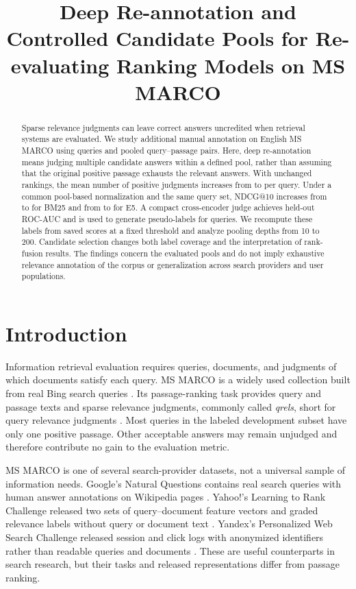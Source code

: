 \documentclass[runningheads,a4paper]{llncs}
\title{Deep Re-annotation and Controlled Candidate Pools for Re-evaluating Ranking Models on MS MARCO}
\author{}
\institute{}
\begin{document}
\maketitle
\begin{abstract}
Sparse relevance judgments can leave correct answers uncredited when retrieval systems are evaluated. We study additional manual annotation on English MS MARCO using \ManualQueryCount{} queries and \ManualPairCount{} pooled query--passage pairs. Here, deep re-annotation means judging multiple candidate answers within a defined pool, rather than assuming that the original positive passage exhausts the relevant answers. With unchanged rankings, the mean number of positive judgments increases from \OriginalMeanRel{} to \HumanMeanRel{} per query. Under a common pool-based normalization and the same query set, NDCG@10 increases from \BmOriginal{} to \BmHuman{} for BM25 and from \EOriginal{} to \EHuman{} for E5. A compact cross-encoder judge achieves held-out ROC-AUC \JudgeTestAuc{} and is used to generate pseudo-labels for \FullQueryCount{} queries. We recompute these labels from saved scores at a fixed threshold and analyze pooling depths from 10 to 200. Candidate selection changes both label coverage and the interpretation of rank-fusion results. The findings concern the evaluated pools and do not imply exhaustive relevance annotation of the corpus or generalization across search providers and user populations.
\end{abstract}

\section{Introduction}
\label{sec:intro}

Information retrieval evaluation requires queries, documents, and judgments of which documents satisfy each query. MS MARCO is a widely used collection built from real Bing search queries \cite{bajaj2016msmarco}. Its passage-ranking task provides query and passage texts and sparse relevance judgments, commonly called \emph{qrels}, short for query relevance judgments \cite{msmarco_datasets}. Most queries in the labeled development subset have only one positive passage. Other acceptable answers may remain unjudged and therefore contribute no gain to the evaluation metric.

MS MARCO is one of several search-provider datasets, not a universal sample of information needs. Google's Natural Questions contains real search queries with human answer annotations on Wikipedia pages \cite{kwiatkowski2019naturalquestions}. Yahoo!'s Learning to Rank Challenge released two sets of query--document feature vectors and graded relevance labels without query or document text \cite{chapelle2011yahoo}. Yandex's Personalized Web Search Challenge released session and click logs with anonymized identifiers rather than readable queries and documents \cite{yandex2013personalized}. These are useful counterparts in search research, but their tasks and released representations differ from passage ranking.
\end{document}
